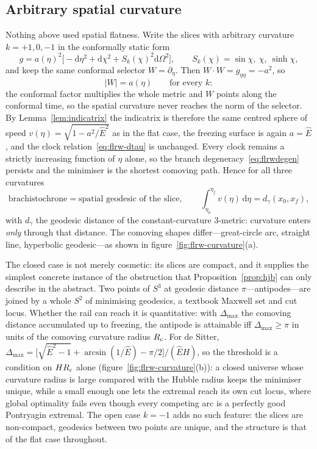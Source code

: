 \documentclass[12pt]{iopart}
\newcommand{\Ehat}{\hat E}
\newcommand{\dd}{\mathrm{d}}
\theoremstyle{plain}
\theoremstyle{definition}
\theoremstyle{plain}
\theoremstyle{remark}
\begin{document}
\subsection{Arbitrary spatial curvature}
\label{sec:flrw-curvature}
Nothing above used spatial flatness. Write the slices with arbitrary curvature
$k=+1,0,-1$ in the conformally static form
\begin{equation}
   g=a(\eta)^2\Big[-\dd\eta^2+\dd\chi^2+S_k(\chi)^2\dd\Omega^2\Big],
   \qquad S_k(\chi)=\sin\chi,\ \chi,\ \sinh\chi ,
   \label{eq:flrw-k}
\end{equation}
and keep the same conformal selector $W=\partial_\eta$. Then $W\cdot W=g_{\eta\eta}=-a^2$,
so
\begin{equation}
   |W|=a(\eta)\qquad\text{for every }k :
   \label{eq:Wnorm-k}
\end{equation}
the conformal factor multiplies the whole metric and $W$ points along the conformal time,
so the spatial curvature never reaches the norm of the selector. By
Lemma~\ref{lem:indicatrix} the indicatrix is therefore the same centred sphere of speed
$v(\eta)=\sqrt{1-a^2/\Ehat^2}$ as in the flat case, the freezing surface is again
$a=\Ehat$, and the clock relation~\eqref{eq:flrw-dtau} is unchanged. Every clock remains a
strictly increasing function of $\eta$ alone, so the branch degeneracy~\eqref{eq:flrwdegen}
persists and the minimiser is the shortest comoving path. Hence for all three curvatures
\begin{equation}
   \text{brachistochrone}=\text{spatial geodesic of the slice},
   \qquad
   \int_{\eta_0}^{\eta_f}v(\eta)\,\dd\eta=d_\gamma(x_0,x_f),
   \label{eq:flrw-geodesic}
\end{equation}
with $d_\gamma$ the geodesic distance of the constant-curvature $3$-metric: curvature
enters \emph{only} through that distance. The comoving shapes differ---great-circle arc,
straight line, hyperbolic geodesic---as shown in
figure~\ref{fig:flrw-curvature}(a).

The closed case is not merely cosmetic: its slices are compact, and it supplies the
simplest concrete instance of the obstruction that Proposition~\ref{prop:hjb} can only
describe in the abstract. Two points of $S^3$ at geodesic distance $\pi$---antipodes---are
joined by a whole $S^2$ of minimising geodesics, a textbook Maxwell set and cut locus.
Whether the rail can reach it is quantitative: with $\Delta_{\max}$ the comoving distance
accumulated up to freezing, the antipode is attainable iff $\Delta_{\max}\ge\pi$ in units
of the comoving curvature radius $R_{\rm c}$. For de Sitter,
$\Delta_{\max}=\big[\sqrt{\Ehat^2-1}+\arcsin(1/\Ehat)-\pi/2\big]/(\Ehat H)$, so the
threshold is a condition on $HR_{\rm c}$ alone
(figure~\ref{fig:flrw-curvature}(b)): a closed universe whose curvature radius is large
compared with the Hubble radius keeps the minimiser unique, while a small enough one lets
the extremal reach its own cut locus, where global optimality fails even though every
competing arc is a perfectly good Pontryagin extremal. The open case $k=-1$ adds no such
feature: the slices are non-compact, geodesics between two points are unique, and the
structure is that of the flat case throughout.
\end{document}
